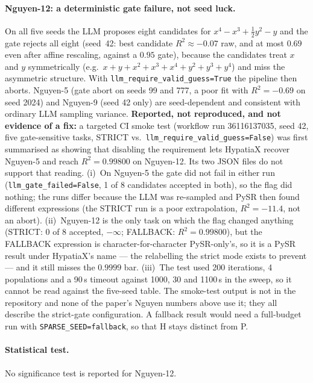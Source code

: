 \documentclass[twoside,11pt]{article}
\newcommand{\Rsq}{R^{2}}
\begin{document}
\paragraph{Nguyen-12: a deterministic gate failure, not seed luck.} On all five
seeds the LLM proposes eight candidates for $x^4-x^3+\tfrac12y^2-y$ and the gate
rejects all eight (seed~42: best candidate $\Rsq\approx-0.07$ raw, and at most $0.69$ even after affine rescaling, against a $0.95$ gate), because the
candidates treat $x$ and $y$ symmetrically (e.g.\ $x+y+x^2+x^3+x^4+y^2+y^3+y^4$)
and miss the asymmetric structure. With \texttt{llm\_require\_valid\_guess=True}
the pipeline then aborts. Nguyen-5 (gate abort on seeds 99 and 777, a poor fit
with $\Rsq=-0.69$ on seed 2024) and Nguyen-9 (seed 42 only) are seed-dependent
and consistent with ordinary LLM sampling variance. \textbf{Reported, not reproduced, and not evidence of a fix:} a
targeted CI smoke test (workflow run 36116137035, seed 42, five gate-sensitive tasks,
STRICT vs.\ \texttt{llm\_require\_valid\_guess=False}) was first summarised as showing that
disabling the requirement lets HypatiaX recover Nguyen-5 and reach $\Rsq=0.99800$ on
Nguyen-12. Its two JSON files do not support that reading.
(i)~On Nguyen-5 the gate did not fail in either run (\texttt{llm\_gate\_failed=False}, 1 of 8
candidates accepted in both), so the flag did nothing; the runs differ because the LLM was
re-sampled and PySR then found different expressions (the STRICT run is a poor extrapolation,
$\Rsq=-11.4$, not an abort).
(ii)~Nguyen-12 is the only task on which the flag changed anything (STRICT: 0 of 8 accepted,
$-\infty$; FALLBACK: $\Rsq=0.99800$), but the FALLBACK expression is character-for-character
PySR-only's, so it is a PySR result under HypatiaX's name --- the relabelling the strict
mode exists to prevent --- and it still misses the $0.9999$ bar.
(iii)~The test used 200 iterations, 4 populations and a 90\,s timeout against 1000, 30 and
1100\,s in the sweep, so it cannot be read against the five-seed table.
The smoke-test output is not in the repository and none of the paper's Nguyen numbers above
use it; they all describe the strict-gate configuration. A fallback result would need a
full-budget run with \texttt{SPARSE\_SEED=fallback}, so that H stays distinct from P.


\paragraph{Statistical test.} No significance test is reported for Nguyen-12.
\end{document}
